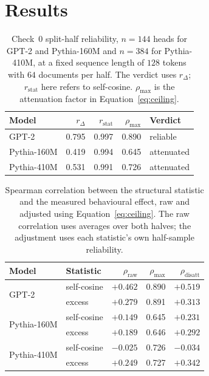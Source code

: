 \documentclass{article} %
\begin{document}
\section{Results}

\begin{table}[tb]
\centering
\small
\begin{tabular}{@{}lrrrl@{}}
\toprule
Model & $r_\Delta$ & $r_{\text{stat}}$ & $\rho_{\max}$ & Verdict \\
\midrule
GPT-2         & 0.795 & 0.997 & 0.890 & reliable \\
Pythia-160M   & 0.419 & 0.994 & 0.645 & attenuated \\
Pythia-410M   & 0.531 & 0.991 & 0.726 & attenuated \\
\bottomrule
\end{tabular}
\caption{Check~0 split-half reliability, $n = 144$ heads for GPT-2 and
Pythia-160M and $n = 384$ for Pythia-410M, at a fixed sequence length of $128$
tokens with $64$ documents per half. The verdict uses $r_\Delta$;
$r_{\text{stat}}$ here refers to self-cosine. $\rho_{\max}$ is the
attenuation factor in Equation~\ref{eq:ceiling}.}
\label{tab:reliability}
\end{table}

\begin{table}[tb]
\centering
\small
\begin{tabular}{@{}llrrr@{}}
\toprule
Model & Statistic & $\rho_{\text{raw}}$ & $\rho_{\max}$ & $\rho_{\text{disatt}}$ \\
\midrule
\multirow{2}{*}{GPT-2}
  & self-cosine & $+0.462$ & 0.890 & $+0.519$ \\
  & excess      & $+0.279$ & 0.891 & $+0.313$ \\
\multirow{2}{*}{Pythia-160M}
  & self-cosine & $+0.149$ & 0.645 & $+0.231$ \\
  & excess      & $+0.189$ & 0.646 & $+0.292$ \\
\multirow{2}{*}{Pythia-410M}
  & self-cosine & $-0.025$ & 0.726 & $-0.034$ \\
  & excess      & $+0.249$ & 0.727 & $+0.342$ \\
\bottomrule
\end{tabular}
\caption{Spearman correlation between the structural statistic and the measured
behavioural effect, raw and adjusted using Equation~\ref{eq:ceiling}.
The raw correlation uses averages over both halves; the adjustment uses
each statistic's own half-sample reliability.}
\label{tab:a2}
\end{table}
\end{document}
